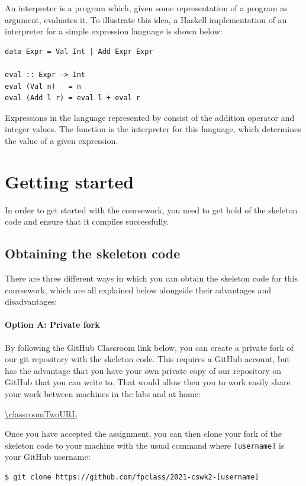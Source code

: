 An interpreter is a program which, given some representation of a program as argument, evaluates it. To illustrate this idea, a Haskell implementation of an interpreter for a simple expression language is shown below:
\begin{verbatim}
data Expr = Val Int | Add Expr Expr 

eval :: Expr -> Int
eval (Val n)   = n
eval (Add l r) = eval l + eval r
\end{verbatim}
Expressions in the language represented by  consist of the addition operator and integer values. The  function is the interpreter for this language, which determines the value of a given expression.

\section{Getting started}

In order to get started with the coursework, you need to get hold of the skeleton code and ensure that it compiles successfully. 

\subsection{Obtaining the skeleton code}

There are three different ways in which you can obtain the skeleton code for this coursework, which are all explained below alongside their advantages and disadvantages:

\paragraph{Option A: Private fork} By following the GitHub Classroom link below, you can create a private fork of our git repository with the skeleton code. This requires a GitHub account, but has the advantage that you have your own private copy of our repository on GitHub that you can write to. That would allow then you to work easily share your work between machines in the labs and at home:
\begin{center}
	\url{\classroomTwoURL}
\end{center}
Once you have accepted the assignment, you can then clone your fork of the skeleton code to your machine with the usual  command where \texttt{\small [username]} is your GitHub username:
\begin{verbatim}
$ git clone https://github.com/fpclass/2021-cswk2-[username]
\end{verbatim}

